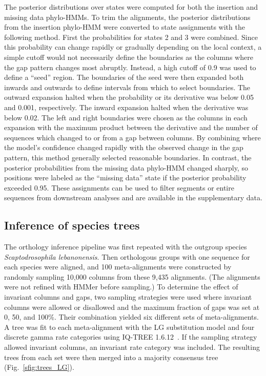 \documentclass[10pt,letterpaper]{article}
\begin{document}
The posterior distributions over states were computed for both the insertion and missing data phylo-HMMs. To trim the alignments, the posterior distributions from the insertion phylo-HMM were converted to state assignments with the following method. First the probabilities for states 2 and 3 were combined. Since this probability can change rapidly or gradually depending on the local context, a simple cutoff would not necessarily define the boundaries as the columns where the gap pattern changes most abruptly. Instead, a high cutoff of 0.9 was used to define a “seed” region. The boundaries of the seed were then expanded both inwards and outwards to define intervals from which to select boundaries. The outward expansion halted when the probability or its derivative was below 0.05 and 0.001, respectively. The inward expansion halted when the derivative was below 0.02. The left and right boundaries were chosen as the columns in each expansion with the maximum product between the derivative and the number of sequences which changed to or from a gap between columns. By combining where the model’s confidence changed rapidly with the observed change in the gap pattern, this method generally selected reasonable boundaries. In contrast, the posterior probabilities from the missing data phylo-HMM changed sharply, so positions were labeled as the ``missing data'' state if the posterior probability exceeded 0.95. These assignments can be used to filter segments or entire sequences from downstream analyses and are available in the supplementary data.

\subsection*{Inference of species trees}
The orthology inference pipeline was first repeated with the outgroup species \textit{Scaptodrosophila lebanonensis}. Then orthologous groups with one sequence for each species were aligned, and 100 meta-alignments were constructed by randomly sampling 10,000 columns from these 9,435 alignments. (The alignments were not refined with HMMer before sampling.) To determine the effect of invariant columns and gaps, two sampling strategies were used where invariant columns were allowed or disallowed and the maximum fraction of gaps was set at 0, 50, and 100\%. Their combination yielded six different sets of meta-alignments. A tree was fit to each meta-alignment with the LG substitution model and four discrete gamma rate categories using IQ-TREE 1.6.12~\cite{Nguyen2014, Le2008, Yang1994}. If the sampling strategy allowed invariant columns, an invariant rate category was included. The resulting trees from each set were then merged into a majority consensus tree (Fig.~\ref{sfig:trees_LG}).
\end{document}
